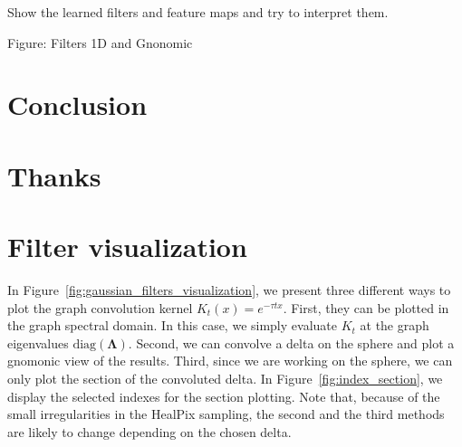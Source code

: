 \documentclass[final,twocolumn,3p,times,authoryear]{elsarticle}
\newcommand{\todo}[1]{{\color[rgb]{.6,.1,.6}{#1}}}
\newcommand{\assign}[1]{{\color[rgb]{.8,.5,.8}{Assigned: #1 }}}
\renewcommand{\b}[1]{{\bm{#1}}}   %
\newcommand{\1}{\b{1}}              %
\newcommand{\0}{\b{0}}              %
\newcommand{\bLambda}{\b{\Lambda}}
\begin{document}
Show the learned filters and feature maps and try to interpret them.
\todo{\\ TK and NP: Figure of filters from the mass map clasification}

Figure: Filters 1D and Gnonomic

\section{Conclusion}
\label{sec:conclusion}
\assign{Nathanaël, Tomek, Michaël}

\section*{Thanks}

\appendix

\section{Filter visualization}
\label{app:filter_visualization}

In Figure~\ref{fig:gaussian_filters_visualization}, we present three different
ways to plot the graph convolution kernel $K_t(x)=e^{-\tau t x}$. First, they can
be plotted in the graph spectral domain. In this case, we simply evaluate $K_t$
at the graph eigenvalues $\text{diag}(\bLambda)$. Second, we can convolve a
delta on the sphere and plot a gnomonic view of the results. Third, since we are
working on the sphere, we can only plot the section of the convoluted delta. In
Figure~\ref{fig:index_section}, we display the selected indexes for the section
plotting. Note that, because of the small irregularities in the HealPix
sampling, the second and the third methods are likely to change depending on the
chosen delta.
\end{document}
